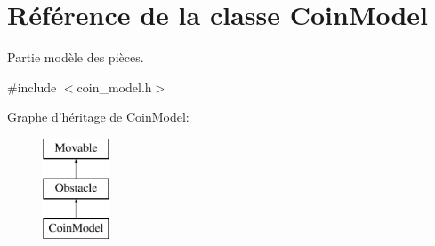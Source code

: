 \hypertarget{class_coin_model}{\section{Référence de la classe Coin\+Model}
\label{class_coin_model}
}


Partie modèle des pièces.  




{\ttfamily \#include $<$coin\+\_\+model.\+h$>$}

Graphe d'héritage de Coin\+Model\+:\begin{figure}[H]
\begin{center}
\leavevmode
\includegraphics[height=3.000000cm]{class_coin_model}
\end{center}
\end{figure}
